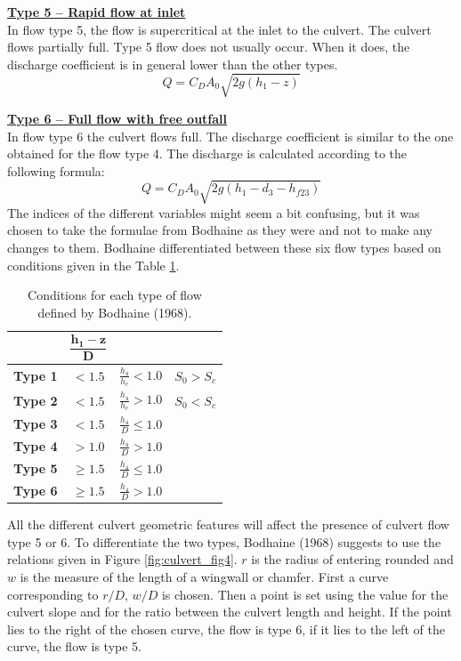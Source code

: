\underline{\textbf{Type 5 -- Rapid flow at inlet}}\\

In flow type 5, the flow is supercritical at the inlet to the culvert.
The culvert flows partially full. Type 5 flow does not usually occur.
When it does, the discharge coefficient is in general lower than the other types.
\begin{equation}
Q=C_D A_0 \sqrt{2g(h_1-z)}
\end{equation}

\underline{\textbf{Type 6 -- Full flow with free outfall}}\\

In flow type 6 the culvert flows full. The discharge coefficient is similar to the
one obtained for the flow type 4.
The discharge is calculated according to the following formula:
\begin{equation}
Q=C_D A_0 \sqrt{2g(h_1-d_3-h_{f23})}
\end{equation}
The indices of the different variables might seem a bit confusing,
but it was chosen to take the formulae from Bodhaine as they were
and not to make any changes to them.
Bodhaine differentiated between these six flow types based on conditions
given in the Table \ref{tab:culvert_tab1}.

\begin{table}[H]
\caption{Conditions for each type of flow defined by Bodhaine (1968).}\label{tab:culvert_tab1}
\begin{center}\begin{tabular}{|c|c|c|c|}
\hline
~ & $\mathbf{\dfrac{h_1-z}{D}}$ & ~ & ~\\
\hline
\textbf{Type 1} & $<1.5$    &  $\frac{h_4}{h_c} < 1.0$ & $S_0 > S_c$\\
\hline
\textbf{Type 2} & $<1.5$    &  $\frac{h_4}{h_c} > 1.0$ & $S_0 < S_c$\\
\hline
\textbf{Type 3} & $<1.5$    & $\frac{h_4}{D} \le 1.0$ & ~\\
\hline
\textbf{Type 4} & $> 1.0$   & $\frac{h_4}{D} > 1.0$ & ~\\
\hline
\textbf{Type 5} & $\ge 1.5$ & $\frac{h_4}{D} \le 1.0$ & ~\\
\hline
\textbf{Type 6} & $\ge 1.5$ & $\frac{h_4}{D} > 1.0$  & ~\\
\hline
\end{tabular}\end{center}
\end{table}

All the different culvert geometric features will affect the presence of culvert flow type 5 or 6.
To differentiate the two types, Bodhaine (1968) suggests to use the relations given in Figure \ref{fig:culvert_fig4}.
$r$ is the radius of entering rounded and $w$ is the measure of the length of a wingwall
or chamfer. First a curve corresponding to $r/D$, $w/D$ is chosen.
Then a point is set using the value for the culvert slope and for the ratio
between the culvert length and height.
If the point lies to the right of the chosen curve, the flow is type 6,
if it lies to the left of the curve, the flow is type 5.

